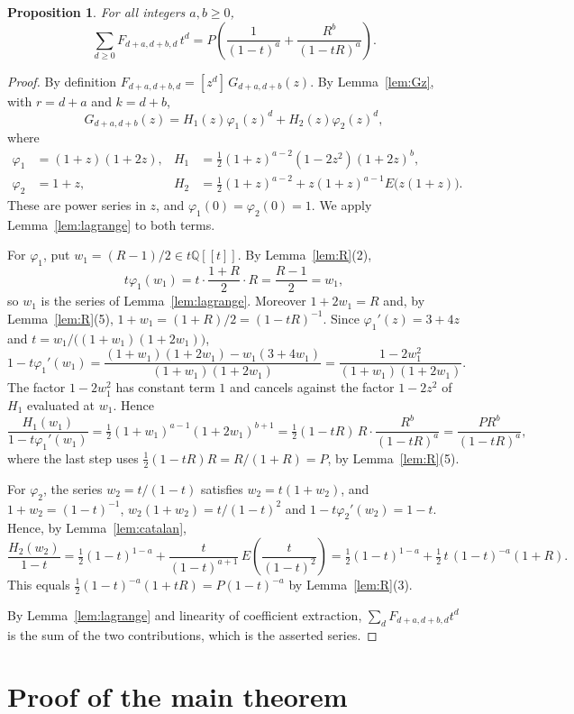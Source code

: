 \documentclass{amsart}
\newtheorem{proposition}[theorem]{Proposition}
\theoremstyle{definition}
\theoremstyle{remark}
\numberwithin{equation}{section}
\newcommand{\Q}{\mathbb{Q}}
\newcommand{\coef}[1]{[#1]\,}
\begin{document}
\begin{proposition}\label{prop:Fdiag}
For all integers $a,b\ge0$,
\[
\sum_{d\ge0}F_{d+a,d+b,d}\,t^d=P\left(\frac{1}{(1-t)^{a}}+\frac{R^b}{(1-tR)^{a}}\right).
\]
\end{proposition}

\begin{proof}
By definition $F_{d+a,d+b,d}=\coef{z^d}G_{d+a,d+b}(z)$. By Lemma~\ref{lem:Gz}, with $r=d+a$ and $k=d+b$,
\[
G_{d+a,d+b}(z)=H_1(z)\varphi_1(z)^d+H_2(z)\varphi_2(z)^d,
\]
where
\begin{align*}
\varphi_1&=(1+z)(1+2z), & H_1&=\tfrac12(1+z)^{a-2}(1-2z^2)(1+2z)^b,\\
\varphi_2&=1+z, & H_2&=\tfrac12(1+z)^{a-2}+z(1+z)^{a-1}E\bigl(z(1+z)\bigr).
\end{align*}
These are power series in $z$, and $\varphi_1(0)=\varphi_2(0)=1$. We apply Lemma~\ref{lem:lagrange} to both terms.

For $\varphi_1$, put $w_1=(R-1)/2\in t\Q[[t]]$. By Lemma~\ref{lem:R}(2),
\[
t\varphi_1(w_1)=t\cdot\frac{1+R}{2}\cdot R=\frac{R-1}{2}=w_1,
\]
so $w_1$ is the series of Lemma~\ref{lem:lagrange}. Moreover $1+2w_1=R$ and, by Lemma~\ref{lem:R}(5), $1+w_1=(1+R)/2=(1-tR)^{-1}$. Since $\varphi_1'(z)=3+4z$ and $t=w_1/\bigl((1+w_1)(1+2w_1)\bigr)$,
\[
1-t\varphi_1'(w_1)=\frac{(1+w_1)(1+2w_1)-w_1(3+4w_1)}{(1+w_1)(1+2w_1)}=\frac{1-2w_1^2}{(1+w_1)(1+2w_1)}.
\]
The factor $1-2w_1^2$ has constant term $1$ and cancels against the factor $1-2z^2$ of $H_1$ evaluated at $w_1$. Hence
\[
\frac{H_1(w_1)}{1-t\varphi_1'(w_1)}=\tfrac12(1+w_1)^{a-1}(1+2w_1)^{b+1}=\tfrac12(1-tR)\,R\cdot\frac{R^b}{(1-tR)^{a}}=\frac{PR^b}{(1-tR)^{a}},
\]
where the last step uses $\tfrac12(1-tR)R=R/(1+R)=P$, by Lemma~\ref{lem:R}(5).

For $\varphi_2$, the series $w_2=t/(1-t)$ satisfies $w_2=t(1+w_2)$, and $1+w_2=(1-t)^{-1}$, $w_2(1+w_2)=t/(1-t)^2$ and $1-t\varphi_2'(w_2)=1-t$. Hence, by Lemma~\ref{lem:catalan},
\[
\frac{H_2(w_2)}{1-t}=\tfrac12(1-t)^{1-a}+\frac{t}{(1-t)^{a+1}}\,E\!\left(\frac{t}{(1-t)^2}\right)
=\tfrac12(1-t)^{1-a}+\tfrac12\,t\,(1-t)^{-a}(1+R).
\]
This equals $\tfrac12(1-t)^{-a}(1+tR)=P(1-t)^{-a}$ by Lemma~\ref{lem:R}(3).

By Lemma~\ref{lem:lagrange} and linearity of coefficient extraction, $\sum_{d}F_{d+a,d+b,d}t^d$ is the sum of the two contributions, which is the asserted series.
\end{proof}

\section{Proof of the main theorem}\label{sec:proof}
\end{document}
